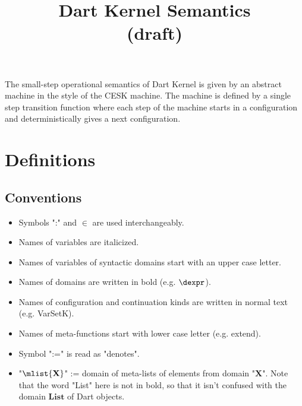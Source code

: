 \documentclass{article}
\begin{document}
\title{Dart Kernel Semantics \\ (draft)}

\maketitle

The small-step operational semantics of Dart Kernel is given by an abstract machine in the style of the CESK machine. The machine is defined by a single step transition function where each step of the machine starts in a configuration and deterministically gives a next configuration.

\section{Definitions}
\label{sec:definitions}
\subsection{Conventions}
\label{subsec:conventions}
\begin{itemize}
\setlength{\itemsep}{0pt}
\item Symbols ":" and $\in$ are used interchangeably.
\item Names of variables are italicized.
\item Names of variables of syntactic domains start with an upper case letter.
\item Names of domains are written in bold (e.g. $\dexpr$).
\item Names of configuration and continuation kinds are written in normal text (e.g. VarSetK).
\item Names of meta-functions start with lower case letter (e.g. extend).
\item Symbol ":=" is read as "denotes".
\item "$\mlist{\mathbf{X}}$" := domain of meta-lists of elements from domain "$\mathbf{X}$". Note that the word "List" here is not in bold, so that it isn't confused with the domain $\mathbf{List}$ of Dart objects.
\end{itemize}
\end{document}
